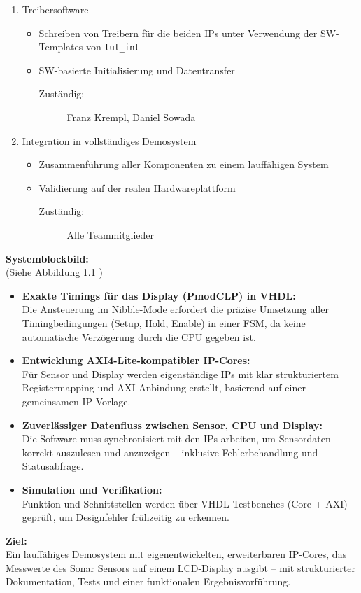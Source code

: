 \begin{enumerate}
   \item Treibersoftware
   \begin{itemize}
     \item Schreiben von Treibern für die beiden IPs unter Verwendung der SW-Templates von \texttt{tut\_int}
     \item SW-basierte Initialisierung und Datentransfer
     \begin{description}
       \item[Zuständig:] Franz Krempl, Daniel Sowada
     \end{description}
   \end{itemize}
   \item Integration in vollständiges Demosystem
   \begin{itemize}
     \item Zusammenführung aller Komponenten zu einem lauffähigen System
     \item Validierung auf der realen Hardwareplattform
     \begin{description}
       \item[Zuständig:] Alle Teammitglieder
     \end{description}
   \end{itemize}
\end{enumerate}
\textbf{Systemblockbild:}\\
(Siehe Abbildung 1.1 )\\
\begin{itemize}
  \item \textbf{Exakte Timings für das Display (PmodCLP) in VHDL:}\\
  Die Ansteuerung im Nibble-Mode erfordert die präzise Umsetzung aller Timingbedingungen (Setup, Hold, Enable) in einer FSM, da keine automatische Verzögerung durch die CPU gegeben ist.
\item \textbf{Entwicklung AXI4-Lite-kompatibler IP-Cores:}\\
  Für Sensor und Display werden eigenständige IPs mit klar strukturiertem Registermapping und AXI-Anbindung erstellt, basierend auf einer gemeinsamen IP-Vorlage.
\item \textbf{Zuverlässiger Datenfluss zwischen Sensor, CPU und Display:}\\
  Die Software muss synchronisiert mit den IPs arbeiten, um Sensordaten korrekt auszulesen und anzuzeigen – inklusive Fehlerbehandlung und Statusabfrage.
\item \textbf{Simulation und Verifikation:}\\
  Funktion und Schnittstellen werden über VHDL-Testbenches (Core + AXI) geprüft, um Designfehler frühzeitig zu erkennen.
\end{itemize}
\textbf{Ziel:}\\
Ein lauffähiges Demosystem mit eigenentwickelten, erweiterbaren IP-Cores, das Messwerte des Sonar Sensors auf einem LCD-Display ausgibt – mit strukturierter Dokumentation, Tests und einer funktionalen Ergebnisvorführung.
